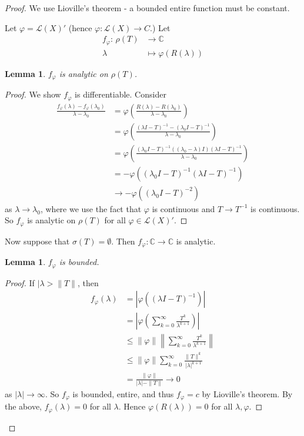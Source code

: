 \documentclass[10pt, oneside, reqno]{amsbook}
\theoremstyle{plain}%
\newtheorem{lem}[thm]{Lemma}
\theoremstyle{definition}
\theoremstyle{remark}
\newcommand{\Com}{\mathbb{C}}
\newcommand{\mapping}[5]{\begin{align*}
    #1 : \,     #2 &\rightarrow #3 \\
            #4  &\mapsto #5
\end{align*}    
}
\renewcommand{\phi}{\varphi}
\begin{document}
\begin{proof}
    We use Lioville's theorem - a bounded entire function must be constant.  
    
    Let $\phi = \mathcal L(X)'$ (hence $\phi : \mathcal L(X) \rightarrow C$.)  Let \mapping{f_\phi}{\rho(T)}{\Com}{\lambda}{\phi(R(\lambda))} 
    \begin{lem}
     $f_\phi$ is analytic on $\rho(T)$.         
    \end{lem}
    \begin{proof}
        We show $f_\phi$ is differentiable.  Consider \begin{align*}
            \frac{f_\phi(\lambda) - f_\phi(\lambda_0)}{\lambda - \lambda_0} &= \phi\left(\frac{R(\lambda) - R(\lambda_0)}{\lambda - \lambda_0} \right)  \\
            &= \phi \left( \frac{(\lambda I - T)^{-1} - (\lambda_0 I - T)^{-1}}{\lambda - \lambda_0}  \right) \\
            &= \phi \left( \frac{(\lambda_0 I - T)^{-1}( (\lambda_0 - \lambda) I)(\lambda I - T)^{-1}}{\lambda - \lambda_0} \right) \\
            &= -\phi \left( (\lambda_0 I - T)^{-1} (\lambda I - T)^{-1} \right) \\
            &\rightarrow -\phi \left( (\lambda_0 I - T)^{-2} \right)
        \end{align*} 
        as $\lambda \rightarrow \lambda_0$, where we use the fact that $\phi$ is continuous and $T \rightarrow T^{-1}$ is continuous.    So $f_\phi$ is analytic on $\rho(T)$ for all $\phi \in \mathcal L(X)'$.  
    \end{proof}
    
    Now suppose that $\sigma(T) = \emptyset$.  Then $f_\phi : \Com \rightarrow \Com$ is analytic.
    
    \begin{lem}
        $f_\phi$ is bounded.  
    \end{lem}
    \begin{proof}
        If $|\lambda > \| T \|$, then \begin{align*}
            f_\phi(\lambda) &= \left| \phi \left( ( \lambda I - T)^{-1} \right) \right| \\
                            &= \left| \phi \left( \sum_{k=0}^\infty \frac{T^k}{\lambda^{k+1}} \right) \right| \\
                            &\leq \| \phi \| \left \| \sum_{k=0}^\infty \frac{T^k}{\lambda^{k+1}} \right \| \\
                            &\leq \| \phi \| \sum_{k=0}^\infty \frac{\| T \|^k}{| \lambda|^{k+1}} \\
                            &= \frac{ \| \phi \|}{ |\lambda | - \| T \|} \rightarrow 0
        \end{align*} as $|\lambda| \rightarrow \infty$.  So $f_\phi$ is bounded, entire, and thus $f_\phi = c$ by Lioville's theorem.  By the above, $f_\phi(\lambda) = 0$ for all $\lambda$.  Hence $\phi(R(\lambda)) = 0$ for all $\lambda, \phi$.
        

\end{proof}
\end{proof}
\end{document}
